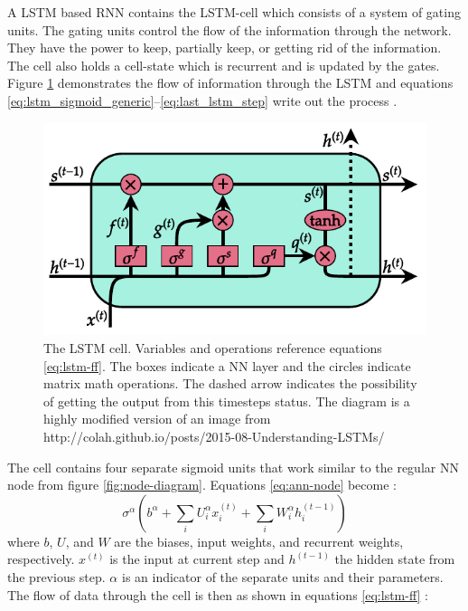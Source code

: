 \documentclass[../main.tex]{subfiles}
\begin{document}
A \ac{LSTM} based \ac{RNN} contains the \ac{LSTM}-cell which consists of a system of gating units.
The gating units control the flow of the information through the network.
They have the power to keep, partially keep, or getting rid of the information.
The cell also holds a cell-state which is recurrent and is updated by the gates.
Figure \ref{fig:lstm-cell} demonstrates the flow of information through the \ac{LSTM} and equations \ref{eq:lstm_sigmoid_generic}--\ref{eq:last_lstm_step} write out the process \cite{Goodfellow2016}.
\begin{figure}[ht!]
    \centering
    \includegraphics{img/LSTM-cell.pdf}
    \caption{The \ac{LSTM} cell. Variables and operations reference equations \ref{eq:lstm-ff}. The boxes indicate a \ac{NN} layer and the circles indicate matrix math operations. The dashed arrow indicates the possibility of getting the output from this timesteps status. The diagram is a highly modified version of an image from http://colah.github.io/posts/2015-08-Understanding-LSTMs/}
    \label{fig:lstm-cell}
\end{figure}
The cell contains four separate sigmoid units that work similar to the regular \ac{NN} node from figure \ref{fig:node-diagram}.
Equations \ref{eq:ann-node} become \cite{Goodfellow2016}:
\begin{equation}
\label{eq:lstm_sigmoid_generic}
    \sigma^{\alpha}\left(b^{\alpha} + \sum_i{U_i^{\alpha} x_i^{(t)}} + \sum_i{W_i^{\alpha} h_i^{(t-1)}} \right)
\end{equation}
where $b$, $U$, and $W$ are the biases, input weights, and recurrent weights, respectively.
$x^{(t)}$ is the input at current step and $h^{(t-1)}$ the hidden state from the previous step.
$\alpha$ is an indicator of the separate units and their parameters.
The flow of data through the cell is then as shown in equations \ref{eq:lstm-ff} \cite{Goodfellow2016}:
\end{document}

